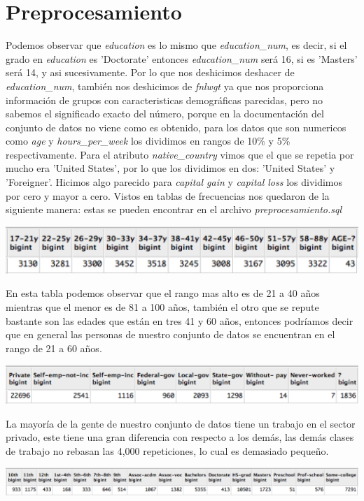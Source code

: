 \documentclass{article}
\begin{document}
\section{Preprocesamiento}
Podemos observar que {\it education} es lo mismo que {\it education\_num}, es decir, si el grado en {\it education} es 'Doctorate' entonces {\it education\_num} será 16, si es 'Masters' será 14, y asi sucesivamente. Por lo que nos deshicimos deshacer de {\it education\_num}, también nos deshicimos de {\it fnlwgt} ya que nos proporciona información de grupos con caracteristicas demográficas parecidas, pero no sabemos el significado exacto del número, porque en la documentación del conjunto de datos no viene como es obtenido, para los datos que son numericos como {\it age} y {\it hours\_per\_week} los dividimos en rangos de 10\% y 5\% respectivamente. Para el atributo {\it native\_country} vimos que el que se repetia por mucho era 'United States', por lo que los dividimos en dos: 'United States' y 'Foreigner'. Hicimos algo parecido para {\it capital gain} y {\it capital loss} los dividimos por cero y mayor a cero. Vistos en tablas de frecuencias nos quedaron de la siguiente manera: estas se pueden encontrar en el archivo {\it preprocesamiento.sql}
  \begin{center}
    \includegraphics{tablas/age}
  \end{center}
  En esta tabla podemos observar que el rango mas alto es de 21 a 40 años mientras que el menor es de 81 a 100 años, también el otro que se repute bastante son las edades que están en tres 41 y 60 años, entonces podríamos decir que en general las personas de nuestro conjunto de datos se encuentran en el rango de 21 a 60 años.
  \begin{center}
    \includegraphics[scale=0.5]{tablas/workclass}
  \end{center}
  La mayoría de la gente de nuestro conjunto de datos tiene un trabajo en el sector privado, este tiene una gran diferencia con respecto a los demás, las demás clases de trabajo no rebasan las 4,000 repeticiones, lo cual es demasiado pequeño.
  \begin{center}
    \includegraphics[scale=0.5]{tablas/education}
  \end{center}
\end{document}
